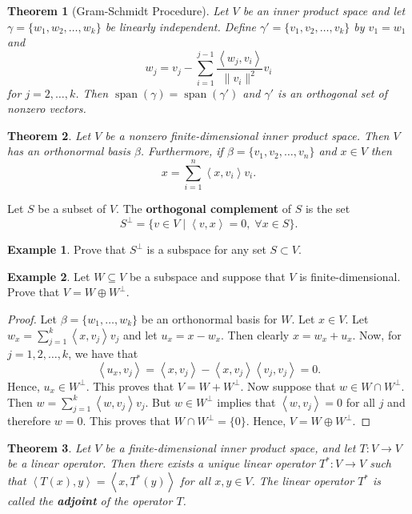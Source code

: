\documentclass[12pt]{article}
\DeclareMathOperator{\spn}{span}
\newcommand{\tv}{T:V\rightarrow V}
\newcommand{\indot}[1]{\left\langle #1 \right\rangle}
\newtheorem{theorem}{Theorem}[section]
\theoremstyle{definition}
\newtheorem{example}{Example}[section]
\begin{document}
\begin{theorem}[Gram-Schmidt Procedure]
Let $V$ be an inner product space and let $\gamma=\{w_1,w_2,\ldots,w_k\}$ be linearly independent.  Define $\gamma'=\{v_1,v_2,\ldots,v_k\}$ by $v_1=w_1$ and 
\[
w_j = v_j - \sum_{i=1}^{j-1} \frac{\indot{w_j,v_i}}{\|v_i\|^2} v_i
\]
for $j=2,\ldots,k$.  Then $\spn(\gamma) = \spn(\gamma')$ and $\gamma'$ is an orthogonal set of nonzero vectors.
\end{theorem}

\begin{theorem}
Let $V$ be a nonzero finite-dimensional inner product space.  Then $V$ has an orthonormal basis $\beta$.  Furthermore, if $\beta=\{v_1,v_2,\ldots,v_n\}$ and $x\in V$ then
\[
x = \sum_{i=1}^n \indot{x,v_i} v_i.
\]
\end{theorem}

Let $S$ be a subset of $V$.  The \textbf{orthogonal complement} of $S$ is the set
\[
S^\perp = \{v\in V\;|\; \indot{v,x}=0, \; \forall x\in S\}.
\]

\begin{example}
Prove that $S^\perp$ is a subspace for any set $S\subset V$.
\end{example}

\begin{example}
Let $W\subseteq V$ be a subspace and suppose that $V$ is finite-dimensional.  Prove that $V=W\oplus W^\perp$.  
\end{example}
\begin{proof}
Let $\beta=\{w_1,\ldots,w_k\}$ be an orthonormal basis for $W$.  Let $x\in V$.  Let $w_x = \sum_{j=1}^k \indot{x,v_j} v_j$ and let $u_x = x-w_x$.  Then clearly $x=w_x + u_x$.  Now, for $j=1,2,\ldots,k$, we have that
\[
\indot{u_x,v_j} = \indot{x,v_j} - \indot{x,v_j}\indot{v_j,v_j} = 0.
\]
Hence, $u_x\in W^\perp$.  This proves that $V=W+W^\perp$.  Now suppose that $w\in W\cap W^\perp$.  Then $w=\sum_{j=1}^k \indot{w,v_j} v_j$.  But $w\in W^\perp$ implies that $\indot{w,v_j}=0$ for all $j$ and therefore $w=0$.  This proves that $W\cap W^\perp =\{0\}$.  Hence, $V=W\oplus W^\perp$.
\end{proof}

\begin{theorem}
Let $V$ be a finite-dimensional inner product space, and let $\tv$ be a linear operator.  Then there exists a unique linear operator $T^*:V\rightarrow V$ such that $\indot{T(x),y}=\indot{x,T^*(y)}$ for all $x,y\in V$.  The linear operator $T^*$ is called the \textbf{adjoint} of the operator $T$.
\end{theorem}
\end{document}
